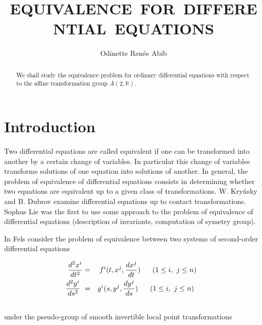 \documentclass{amsproc}
\theoremstyle{remark}
\numberwithin{equation}{section}
\begin{document}
\title{EQUIVALENCE\ FOR\ DIFFERENTIAL\ EQUATIONS}
\author{Odinette Ren\'{e}e Abib}
\address{Laboratoire de Math\'{e}matiques Rapha\"{e}l Salem\\
UMR 6085 CNRS, Universit\'{e} de Rouen\\
76801, Saint Etienne du Rouvray}



\begin{abstract}
We shall study the equivalence problem for ordinary differential
equations with respect to the affine transformation group 
$A( 2,{\mathbb{R}})$.
\end{abstract}

\maketitle

\section{Introduction}

Two differential equations are called equivalent if one can be transformed
into another by a certain change of variables. In particular this change of
variables transforms solutions of one equation into solutions of another. In
general, the problem of equivalence of differential equations consists in
determining whether two equations are equivalent up to a given class of
transformations. W. Kry\'{n}sky \cite{Kr} and B. Dubrov \cite{DKM} examine
differential equations up to contact transformations. Sophus Lie was the
first to use some approach to the problem of equivalence of differential
equations (description of invariants, computation of symetry group).

In \cite{Fe} Fels consider the problem of equivalence between two systems of
second-order differential equations

\begin{eqnarray}
\frac{d^{2}x^{i}}{dt^{2}} &=&f^{i}(t,x^{j},\frac{dx^{j}}{dt})\text{ \ \ \ \ }(1\leq i,\text{ }j\leq n)\text{\ }\text{\ } \label{eq:fle}\\
\frac{d^{2}y^{i}}{ds^{2}}\text{\ } &=&g^{i}(s,y^{j},\frac{dy^{j}}{ds})\text{
\ \ \ \ }(1\leq i,\text{ }j\leq n)\text{ \ \ }\label{eq:chern} \\
&&\text{\ \ }\notag
\end{eqnarray}under the pseudo-group of smooth invertible local point transformations
\end{document}
